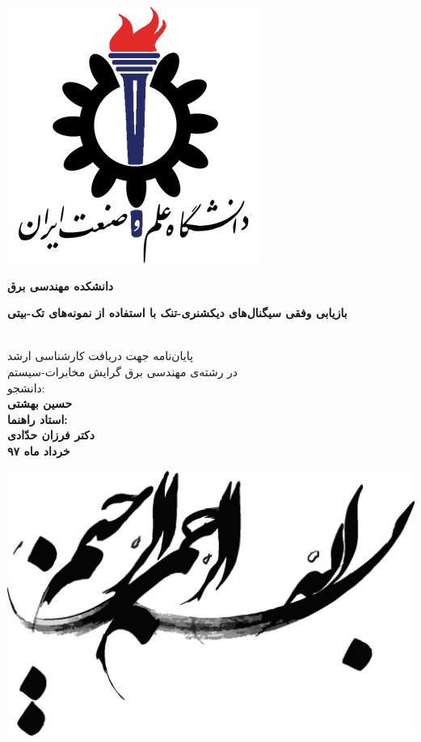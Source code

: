 
\thispagestyle{empty}
\vspace*{-28mm}
\centerline{\includegraphics[scale=0.5]{./Images/general/IUST_logo_color.png}}
\begin{center}
\vspace{-1mm}
\textbf{دانشکده مهندسی برق}
\\[3cm]
\begin{Huge}
\textbf{
بازیابی وفقی سیگنال‌های دیکشنری-تنک با استفاده از نمونه‌های تک-بیتی
}
\end{Huge}
\\[1.5cm]
\Large
پایان‌نامه جهت دریافت کارشناسی ارشد
\\[0.5cm]
در رشته‌ی مهندسی برق گرایش مخابرات-سیستم
\\[1cm]
دانشجو:
\\[0.5cm]
\textbf{حسین بهشتی
\\[1cm]
استاد راهنما:
\\[0.5cm]
دکتر فرزان حدّادی
\\[1cm]
خرداد ماه ۹۷
}
\end{center}
\newpage
\thispagestyle{empty}
\centerline{\includegraphics[scale=0.75]{./Images/general/besmallah.jpg}}